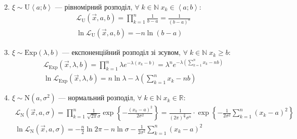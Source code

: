 \begin{enumerate}
\begin{gather*}
    \end{gather*}
    \item $\xi \sim \mathrm{U}\left< a; b\right>$ --- рівномірний розподіл, $\forall \; k \in \mathbb{N} \; x_k \in \left< a; b\right>$:
    \begin{gather*}
        \mathcal{L}_{\mathrm{U}}(\vec{x}, a, b) = \prod\limits_{k=1}^n \frac{1}{b-a} = \frac{1}{(b-a)^n} \\
        \ln\mathcal{L}_{\mathrm{U}}(\vec{x}, a, b) = -n \ln{(b-a)}
    \end{gather*} 
    \item $\xi \sim \mathrm{Exp}(\lambda, b)$ --- експоненційний розподіл зі зсувом, $\forall \; k \in \mathbb{N} \; x_k \geq b$:
    \begin{gather*}
        \mathcal{L}_{\mathrm{Exp}}(\vec{x}, \lambda, b) = \prod\limits_{k=1}^n \lambda e^{-\lambda (x_k-b)} = \lambda^n e^{-\lambda\left(\sum\limits_{k=1}^n x_k - n b\right)} \\
        \ln \mathcal{L}_{\mathrm{Exp}}(\vec{x}, \lambda, b) = n \ln \lambda - \lambda\left(\sum\limits_{k=1}^n x_k - n b\right)
    \end{gather*}
    \item $\xi \sim \mathrm{N}(a, \sigma^2)$ --- нормальний розподіл, $\forall \; k \in \mathbb{N} \; x_k \in \mathbb{R}$:
    \begin{gather*}
        \mathcal{L}_{\mathrm{N}}(\vec{x}, a, \sigma) = \prod\limits_{k=1}^n \frac{1}{\sqrt{2\pi}\sigma} \exp\left\{-\frac{(x_k - a)^2}{2\sigma^2}\right\} =
        \frac{1}{(2\pi)^{\frac{n}{2}} \sigma^n} \cdot \exp\left\{-\frac{1}{2\sigma^2}\sum\limits_{k=1}^n (x_k - a)^2\right\}\\
        \ln \mathcal{L}_{\mathrm{N}}(\vec{x}, a, \sigma) = -\frac{n}{2}\ln{2\pi} - n \ln{\sigma} - \frac{1}{2\sigma^2}\sum\limits_{k=1}^n (x_k - a)^2
    \end{gather*}
\end{enumerate}


